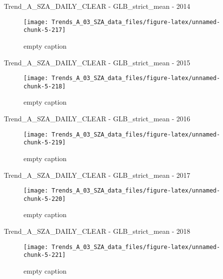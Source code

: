 \documentclass[
  10pt,
  a4paper,oneside]{article}
\begin{document}
Trend\_A\_SZA\_DAILY\_CLEAR - GLB\_strict\_mean - 2014

\begin{figure}[!ht]

{\centering \texttt{[image: Trends\_A\_03\_SZA\_data\_files/figure-latex/unnamed-chunk-5-217]} 

}

\caption{ empty caption }\label{fig:unnamed-chunk-5-217}
\end{figure}

Trend\_A\_SZA\_DAILY\_CLEAR - GLB\_strict\_mean - 2015

\begin{figure}[!ht]

{\centering \texttt{[image: Trends\_A\_03\_SZA\_data\_files/figure-latex/unnamed-chunk-5-218]} 

}

\caption{ empty caption }\label{fig:unnamed-chunk-5-218}
\end{figure}

Trend\_A\_SZA\_DAILY\_CLEAR - GLB\_strict\_mean - 2016

\begin{figure}[!ht]

{\centering \texttt{[image: Trends\_A\_03\_SZA\_data\_files/figure-latex/unnamed-chunk-5-219]} 

}

\caption{ empty caption }\label{fig:unnamed-chunk-5-219}
\end{figure}

Trend\_A\_SZA\_DAILY\_CLEAR - GLB\_strict\_mean - 2017

\begin{figure}[!ht]

{\centering \texttt{[image: Trends\_A\_03\_SZA\_data\_files/figure-latex/unnamed-chunk-5-220]} 

}

\caption{ empty caption }\label{fig:unnamed-chunk-5-220}
\end{figure}

Trend\_A\_SZA\_DAILY\_CLEAR - GLB\_strict\_mean - 2018

\begin{figure}[!ht]

{\centering \texttt{[image: Trends\_A\_03\_SZA\_data\_files/figure-latex/unnamed-chunk-5-221]} 

}

\caption{ empty caption }\label{fig:unnamed-chunk-5-221}
\end{figure}
\end{document}
